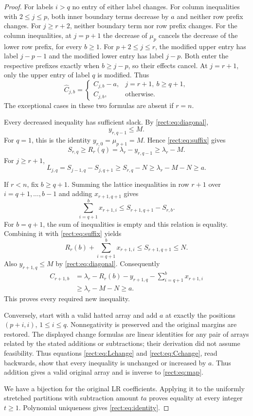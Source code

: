 \documentclass[11pt]{article}
\begin{document}
\begin{proof}
For labels $i>q$ no entry of either label changes.
For column inequalities with $2\le j\le p$, both inner
boundary terms decrease by $a$ and neither row prefix changes.
For $j\ge r+2$, neither boundary term nor row prefix changes.
For the column inequalities, at $j=p+1$ the decrease
of $\mu_p$ cancels the decrease of the lower row
prefix, for every $b\ge1$.
For $p+2\le j\le r$, the modified upper entry has
label $j-p-1$ and the modified lower entry has label
$j-p$. Both enter the respective prefixes exactly
when $b\ge j-p$, so their effects cancel.
At $j=r+1$, only the upper entry of label $q$
is modified. Thus
\begin{equation}\label{rect:eq:Cchange}
\widehat C_{j,b}=
\begin{cases}
C_{j,b}-a,&j=r+1,\ b\ge q+1,\\
C_{j,b},&\text{otherwise}.
\end{cases}
\end{equation}
The exceptional cases in these two formulas are absent
if $r=n$.

Every decreased inequality has sufficient slack.
By \eqref{rect:eq:diagonal},
\[
y_{r,q-1}\le M.
\]
For $q=1$, this is the identity
$y_{r,0}=\mu_{p+1}=M$.
Hence \eqref{rect:eq:suffix} gives
\[
S_{r,q}\ge R_r(q)
 =\lambda_r-y_{r,q-1}\ge\lambda_r-M.
\]
For $j\ge r+1$,
\[
L_{j,q}
 =S_{j-1,q}-S_{j,q+1}
 \ge S_{r,q}-N
 \ge\lambda_r-M-N\ge a.
\]

If $r<n$, fix $b\ge q+1$.
Summing the lattice inequalities in row $r+1$
over $i=q+1,\ldots,b-1$ and adding
$x_{r+1,q+1}$ gives
\[
\sum_{i=q+1}^{b}x_{r+1,i}
 \le S_{r+1,q+1}-S_{r,b}.
\]
For $b=q+1$, the sum of inequalities is empty and
this relation is equality.
Combining it with \eqref{rect:eq:suffix} yields
\[
R_r(b)+\sum_{i=q+1}^{b}x_{r+1,i}
 \le S_{r+1,q+1}\le N.
\]
Also $y_{r+1,q}\le M$ by \eqref{rect:eq:diagonal}.
Consequently
\[
\begin{split}
C_{r+1,b}
 &=\lambda_r-R_r(b)
   -y_{r+1,q}-\sum_{i=q+1}^{b}x_{r+1,i}\\
 &\ge\lambda_r-M-N\ge a.
\end{split}
\]
This proves every required new inequality.

Conversely, start with a valid hatted array and add
$a$ at exactly the positions $(p+i,i)$,
$1\le i\le q$. Nonnegativity is preserved and the
original margins are restored.
The displayed change formulas are linear identities for any pair
of arrays related by the stated additions or subtractions; their
derivation did not assume feasibility. Thus equations
\eqref{rect:eq:Lchange} and \eqref{rect:eq:Cchange}, read backwards, show that every inequality is unchanged
or increased by $a$. Thus addition gives a valid
original array and is inverse to \eqref{rect:eq:map}.

We have a bijection for the original LR coefficients.
Applying it to the uniformly stretched partitions
with subtraction amount $ta$ proves equality at
every integer $t\ge1$. Polynomial uniqueness gives
\eqref{rect:eq:identity}.
\end{proof}
\end{document}
